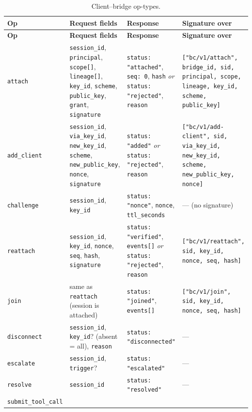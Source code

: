 \footnotesize
\begin{longtable}{p{} p{} p{} p{}}
\caption{Client--bridge op-types.}\label{tab:wire-ops}\\
\toprule
\textbf{Op} & \textbf{Request fields} & \textbf{Response} & \textbf{Signature over} \\
\midrule
\endfirsthead
\toprule
\textbf{Op} & \textbf{Request fields} & \textbf{Response} & \textbf{Signature over} \\
\midrule
\endhead
\texttt{attach} &
\texttt{session\_id}, \texttt{principal}, \texttt{scope[]}, \texttt{lineage[]}, \texttt{key\_id}, \texttt{scheme}, \texttt{public\_key}, \texttt{grant}, \texttt{signature} &
\texttt{status: "attached"}, \texttt{seq: 0}, \texttt{hash} \emph{or} \texttt{status: "rejected"}, \texttt{reason} &
\texttt{["bc/v1/attach", bridge\_id, sid, principal, scope, lineage, key\_id, scheme, public\_key]} \\
\texttt{add\_client} &
\texttt{session\_id}, \texttt{via\_key\_id}, \texttt{new\_key\_id}, \texttt{scheme}, \texttt{new\_public\_key}, \texttt{nonce}, \texttt{signature} &
\texttt{status: "added"} \emph{or} \texttt{status: "rejected"}, \texttt{reason} &
\texttt{["bc/v1/add-client", sid, via\_key\_id, new\_key\_id, scheme, new\_public\_key, nonce]} \\
\texttt{challenge} &
\texttt{session\_id}, \texttt{key\_id} &
\texttt{status: "nonce"}, \texttt{nonce}, \texttt{ttl\_seconds} &
--- (no signature) \\
\texttt{reattach} &
\texttt{session\_id}, \texttt{key\_id}, \texttt{nonce}, \texttt{seq}, \texttt{hash}, \texttt{signature} &
\texttt{status: "verified"}, \texttt{events[]} \emph{or} \texttt{status: "rejected"}, \texttt{reason} &
\texttt{["bc/v1/reattach", sid, key\_id, nonce, seq, hash]} \\
\texttt{join} &
same as \texttt{reattach} (session is attached) &
\texttt{status: "joined"}, \texttt{events[]} &
\texttt{["bc/v1/join", sid, key\_id, nonce, seq, hash]} \\
\texttt{disconnect} &
\texttt{session\_id}, \texttt{key\_id}? (absent = all), \texttt{reason} &
\texttt{status: "disconnected"} &
--- \\
\texttt{escalate} &
\texttt{session\_id}, \texttt{trigger}? &
\texttt{status: "escalated"} &
--- \\
\texttt{resolve} &
\texttt{session\_id} &
\texttt{status: "resolved"} &
--- \\
\texttt{submit\_tool\_call} &

\end{longtable}
